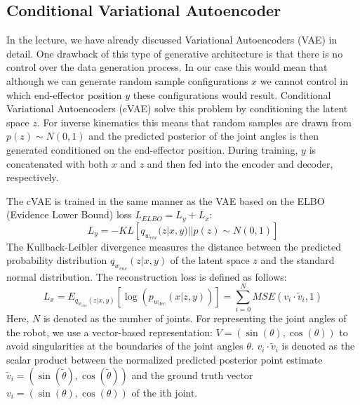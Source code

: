 \documentclass[conference]{IEEEtran}
\begin{document}
\subsection*{Conditional Variational Autoencoder}
In the lecture, we have already discussed Variational Autoencoders (VAE) \cite{Kingma2014} in detail. One drawback of this type of generative architecture is that there is no control over the data generation process. In our case this would mean that although we can generate random sample configurations $x$ we cannot control in which end-effector position $y$ these configurations would result. Conditional Variational Autoencoders (cVAE) \cite{Sohn2015} solve this problem by conditioning the latent space $z$. For inverse kinematics this means that random samples are drawn from $p(z) \sim N(0, 1)$ and the predicted posterior of the joint angles is then generated conditioned on the end-effector position. During training, $y$ is concatenated with both $x$ and $z$ and then fed into the encoder and decoder, respectively.

The cVAE is trained in the same manner as the VAE based on the ELBO (Evidence Lower Bound) loss $L_{ELBO} = L_y + L_x$:
\begin{equation}
L_y = - KL[q_{w_{enc}}(z | x, y) || p(z) \sim N(0, 1) ]
\label{KL}
\end{equation}
The Kullback-Leibler divergence measures the distance between the predicted probability distribution $q_{w_{enc}}(z | x, y)$ of the latent space $z$ and the standard normal distribution. The reconstruction loss is defined as follows: 
\begin{equation}
L_x = E_{q_{w_{enc}}(z | x, y)}[\log(p_{w_{dec}}(x| z, y))] = \sum _ {i=0} ^ N MSE(v_i \cdot \tilde v_i, 1)
\label{MSE}
\end{equation}
Here, $N$ is denoted as the  number of joints. For representing the joint angles of the robot, we use a vector-based representation: $V = (\sin(\theta), \cos(\theta))$ to avoid singularities at the boundaries of the joint angles $\theta$. $v_i \cdot \tilde v_i$ is denoted as the scalar product between the normalized predicted posterior point estimate  $\tilde v_i  = (\sin(\tilde \theta), \cos(\tilde \theta))$ and the ground truth vector  $v_i = (\sin(\theta), \cos(\theta))$ of the ith joint.
\end{document}

